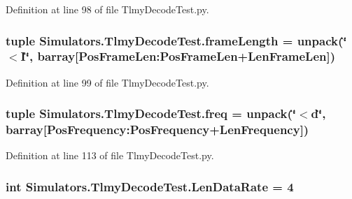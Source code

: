 Definition at line 98 of file Tlmy\+Decode\+Test.\+py.

\hypertarget{namespace_simulators_1_1_tlmy_decode_test_ab02311f6bab529003adb6bf8acec1ae0}{}
\subsubsection[{frame\+Length}]{\setlength{\rightskip}{0pt plus 5cm}tuple Simulators.\+Tlmy\+Decode\+Test.\+frame\+Length = unpack(\char`\"{}$<$I\char`\"{}, barray\mbox{[}Pos\+Frame\+Len\+:\+Pos\+Frame\+Len+{\bf Len\+Frame\+Len}\mbox{]})}\label{namespace_simulators_1_1_tlmy_decode_test_ab02311f6bab529003adb6bf8acec1ae0}


Definition at line 99 of file Tlmy\+Decode\+Test.\+py.

\hypertarget{namespace_simulators_1_1_tlmy_decode_test_a210b8085d3ac672a73c6a91b4268248f}{}
\subsubsection[{freq}]{\setlength{\rightskip}{0pt plus 5cm}tuple Simulators.\+Tlmy\+Decode\+Test.\+freq = unpack(\char`\"{}$<$d\char`\"{}, barray\mbox{[}Pos\+Frequency\+:\+Pos\+Frequency+{\bf Len\+Frequency}\mbox{]})}\label{namespace_simulators_1_1_tlmy_decode_test_a210b8085d3ac672a73c6a91b4268248f}


Definition at line 113 of file Tlmy\+Decode\+Test.\+py.

\hypertarget{namespace_simulators_1_1_tlmy_decode_test_aea72769294377163f46b0b20b1c0a8f5}{}
\subsubsection[{Len\+Data\+Rate}]{\setlength{\rightskip}{0pt plus 5cm}int Simulators.\+Tlmy\+Decode\+Test.\+Len\+Data\+Rate = 4}\label{namespace_simulators_1_1_tlmy_decode_test_aea72769294377163f46b0b20b1c0a8f5}


